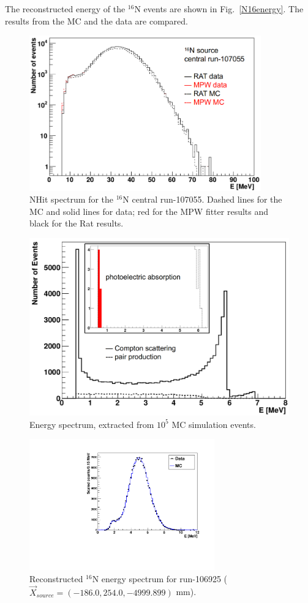 The reconstructed energy of the $^{16}$N events are shown in Fig.~\ref{N16energy}. The results from the MC and the data are compared.
\begin{figure}[htbp]
	\centering
	\includegraphics[width=10cm]{N16_nhits_107055.png}
	\caption{NHit spectrum for the $^{16}$N central run-107055. Dashed lines for the MC and solid lines for data; red for the MPW fitter results and black for the Rat results.}
	\label{N16nhits}
\end{figure}

\begin{figure}[htbp]
	\centering
	\includegraphics[width=12cm]{N16_MCenergySpectrum.png}
	\caption{Energy spectrum, extracted from $10^5$ MC simulation events.}
	\label{N16nhitsSimu}
\end{figure}


\begin{figure}[htbp]
	\centering
	\includegraphics[width=8cm]{N16energyMPWcompare_106925.pdf}
	\caption{Reconstructed $^{16}$N energy spectrum for run-106925 ($\vec{X}_{source}=(-186.0,254.0,-4999.899)$ mm).}
	\label{N16_106925}
\end{figure}


